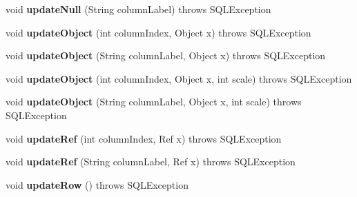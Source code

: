 \begin{DoxyCompactItemize}
\item 
\mbox{\label{classsimpledb_1_1jdbc_1_1ResultSetAdapter_a8c3b51fd3613735fc4cf625bcb02dcfd}} 
void {\bfseries update\+Null} (String column\+Label)  throws S\+Q\+L\+Exception 
\item 
\mbox{\label{classsimpledb_1_1jdbc_1_1ResultSetAdapter_a3b45f9f1a50f4b80b8a405bbb9e9a2cf}} 
void {\bfseries update\+Object} (int column\+Index, Object x)  throws S\+Q\+L\+Exception 
\item 
\mbox{\label{classsimpledb_1_1jdbc_1_1ResultSetAdapter_a2804bd5b721b04802c153edf8fd9f2ef}} 
void {\bfseries update\+Object} (String column\+Label, Object x)  throws S\+Q\+L\+Exception 
\item 
\mbox{\label{classsimpledb_1_1jdbc_1_1ResultSetAdapter_afe2a6c34cfc24f687e8cea2de6cf7b77}} 
void {\bfseries update\+Object} (int column\+Index, Object x, int scale)  throws S\+Q\+L\+Exception 
\item 
\mbox{\label{classsimpledb_1_1jdbc_1_1ResultSetAdapter_af027e2f8595a12955287d508a0d54dac}} 
void {\bfseries update\+Object} (String column\+Label, Object x, int scale)  throws S\+Q\+L\+Exception 
\item 
\mbox{\label{classsimpledb_1_1jdbc_1_1ResultSetAdapter_adc4a9d2ce2af452d0d31a19bbe9d6f5d}} 
void {\bfseries update\+Ref} (int column\+Index, Ref x)  throws S\+Q\+L\+Exception 
\item 
\mbox{\label{classsimpledb_1_1jdbc_1_1ResultSetAdapter_ada7e23556a067133b94c17467b17f8a1}} 
void {\bfseries update\+Ref} (String column\+Label, Ref x)  throws S\+Q\+L\+Exception 
\item 
\mbox{\label{classsimpledb_1_1jdbc_1_1ResultSetAdapter_a81fed0f8bff4b198b53a7425d227196a}} 
void {\bfseries update\+Row} ()  throws S\+Q\+L\+Exception 
\item 
\mbox{\label{classsimpledb_1_1jdbc_1_1ResultSetAdapter_a22569b89d0d14caeee3f3a31bb2f3c21}} 

\end{DoxyCompactItemize}
